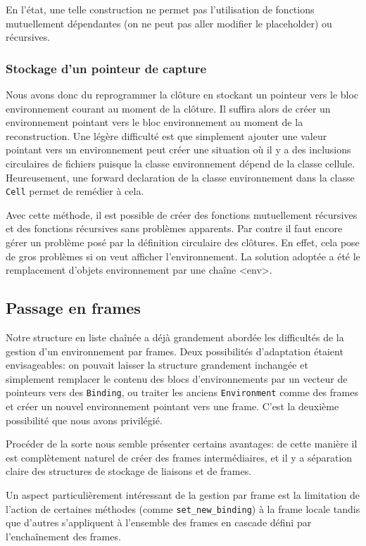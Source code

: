\documentclass[a4paper,11pt]{article}
\begin{document}
En l'état, une telle construction ne permet pas l'utilisation de fonctions
mutuellement dépendantes (on ne peut pas aller modifier le placeholder) ou
récursives.

\subsubsection{Stockage d'un pointeur de capture}

Nous avons donc du reprogrammer la clôture en stockant un pointeur vers le bloc
environnement courant au moment de la clôture. Il suffira alors de créer un
environnement pointant vers le bloc environnement au moment de la reconstruction.
Une légère difficulté est que simplement ajouter une valeur pointant vers un
environnement peut créer une situation où il y a des inclusions circulaires de
fichiers puisque la classe environnement dépend de la classe cellule.
Heureusement, une forward declaration de la classe environnement dans la classe
\texttt{Cell} permet de remédier à cela.

Avec cette méthode, il est possible de créer des fonctions mutuellement
récursives et des fonctions récursives sans problèmes apparents. Par contre il
faut encore gérer un problème posé par la définition circulaire des clôtures.
En effet, cela pose de gros problèmes si on veut afficher l'environnement. La
solution adoptée a été le remplacement d'objets environnement par une chaîne
<env>.

\subsection{Passage en frames}

Notre structure en liste chaînée a déjà grandement abordée les difficultés de la
gestion d'un environnement par frames. Deux possibilités d'adaptation étaient
envisageables: on pouvait laisser la structure grandement inchangée et
simplement remplacer le contenu des blocs d'environnements par un vecteur de
pointeurs vers des \texttt{Binding}, ou traiter les anciens
\texttt{Environment} comme des frames et créer un nouvel environnement pointant
vers une frame. C'est la deuxième possibilité que nous avons privilégié.

Procéder de la sorte nous semble présenter certains avantages: de cette manière
il est complètement naturel de créer des frames intermédiaires, et il y a
séparation claire des structures de stockage de liaisons et de frames.

Un aspect particulièrement intéressant de la gestion par frame est la limitation
de l'action de certaines méthodes (comme \texttt{set\_new\_binding}) à la frame
locale tandis que d'autres s'appliquent à l'ensemble des frames en cascade
défini par l'enchaînement des frames.
\end{document}
